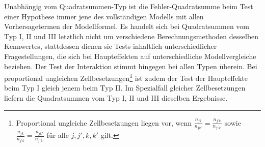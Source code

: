 Unabhängig vom Quadratsummen-Typ ist die Fehler-Quadratsumme beim Test einer Hypothese immer jene des vollständigen Modells mit allen Vorhersagetermen der Modellformel. Es handelt sich bei Quadratsummen vom Typ I, II und III letztlich nicht um verschiedene Berechnungsmethoden desselben Kennwertes, stattdessen dienen sie Tests inhaltlich unterschiedlicher Fragestellungen, die sich bei Haupteffekten auf unterschiedliche Modellvergleiche beziehen. Der Test der Interaktion stimmt hingegen bei allen Typen überein. Bei proportional ungleichen Zellbesetzungen\footnote{Proportional ungleiche Zellbesetzungen liegen vor, wenn $\frac{n_{jk}}{n_{jk'}} = \frac{n_{j'k}}{n_{j'k'}}$ sowie $\frac{n_{jk}}{n_{j'k}} = \frac{n_{jk'}}{n_{j'k'}}$ für alle $j, j', k, k'$ gilt.} ist zudem der Test der Haupteffekte beim Typ I gleich jenem beim Typ II. Im Spezialfall gleicher Zellbesetzungen liefern die Quadratsummen vom Typ I, II und III dieselben Ergebnisse.

